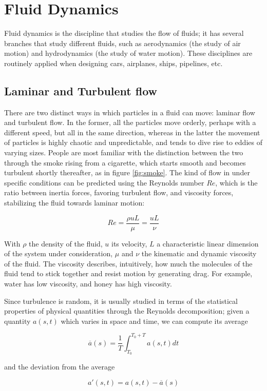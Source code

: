 \documentclass[12pt]{book}
\begin{document}
\section{Fluid Dynamics}
Fluid dynamics is the discipline that studies the flow of fluids; it has several branches that study different fluids, such as aerodynamics (the study of air motion) and hydrodynamics (the study of water motion). These disciplines are routinely applied when designing cars, airplanes, ships, pipelines, etc.

\subsection{Laminar and Turbulent flow}
There are two distinct ways in which particles in a fluid can move: laminar flow and turbulent flow. In the former, all the particles move orderly, perhaps with a different speed, but all in the same direction, whereas in the latter the movement of particles is highly chaotic and unpredictable, and tends to dive rise to eddies of varying sizes. People are most familiar with the distinction between the two through the smoke rising from a cigarette, which starts smooth and becomes turbulent shortly thereafter, as in figure \ref{fig:smoke}. The kind of flow in under specific conditions can be predicted using the Reynolds number $Re$, which is the ratio between inertia forces, favoring turbulent flow, and viscosity forces, stabilizing the fluid towards laminar motion:

$$
Re=\frac{\rho u L}{\mu}=\frac{uL}{\nu}
$$

With $\rho$ the density of the fluid, $u$ its velocity, $L$ a characteristic linear dimension of the system under consideration, $\mu$ and $\nu$ the kinematic and dynamic viscosity of the fluid. The viscosity describes, intuitively, how much the molecules of the fluid tend to stick together and resist motion by generating drag. For example, water has low viscosity, and honey has high viscosity.

Since turbulence is random, it is usually studied in terms of the statistical properties of physical quantities through the Reynolds decomposition; given a quantity $a(s,t)$ which varies in space and time, we can compute its average

$$
\overline{a}(s)=\frac{1}{T}\int_{T_0}^{T_0+T}a(s,t)dt
$$

and the deviation from the average

$$
a'(s,t)=a(s,t)-\overline{a}(s)
$$
\end{document}
